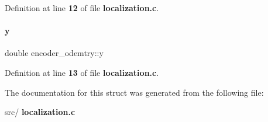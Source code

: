 Definition at line \textbf{ 12} of file \textbf{ localization.\+c}.

\mbox{\label{structencoder__odemtry_a955cbea800158b8c0cd5f36b253fe6bb}} 
\paragraph{y}
{\footnotesize\ttfamily double encoder\+\_\+odemtry\+::y}



Definition at line \textbf{ 13} of file \textbf{ localization.\+c}.



The documentation for this struct was generated from the following file\+:\begin{DoxyCompactItemize}
\item 
src/\textbf{ localization.\+c}\end{DoxyCompactItemize}
